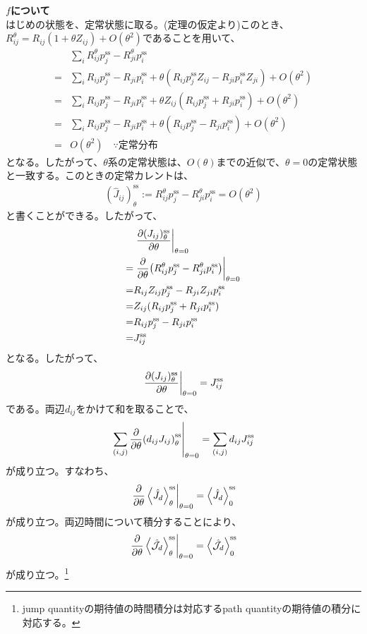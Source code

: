 \documentclass[a4paper,11pt]{jsarticle}
\numberwithin{equation}{section}
\begin{document}
\textbf{$f$について}\\
はじめの状態を、定常状態に取る。(定理の仮定より)このとき、$R_{ij} ^{\theta} = R_{ij}(1+\theta Z_{ij}) + O(\theta^2)$であることを用いて、
\begin{align}
    &\sum_{i}R_{ij}^{\theta} p_j^\text{ss} - R_{ji}^{\theta} p_i^\text{ss} \\
    =& \sum_{i}R_{ij} p_j^\text{ss} - R_{ji} p_i^\text{ss} + \theta (R_{ij} p_j^\text{ss} Z_{ij} - R_{ji} p_i^\text{ss} Z_{ji}) + O(\theta^2)\\
    =& \sum_{i}R_{ij} p_j^\text{ss} - R_{ji} p_i^\text{ss} + \theta Z_{ij}(R_{ij} p_j^\text{ss} + R_{ji} p_i^\text{ss}) + O(\theta^2)\\
    =& \sum_{i}R_{ij} p_j^\text{ss} - R_{ji} p_i^\text{ss} + \theta  (R_{ij} p_j^\text{ss} - R_{ji} p_i^\text{ss}) + O(\theta^2)\\
    =& O(\theta^2) \quad \because \text{定常分布}
\end{align}
となる。したがって、$\theta$系の定常状態は、$O(\theta)$までの近似で、$\theta = 0$の定常状態と一致する。このときの定常カレントは、
\begin{align}
   (\hat{J}_{ij})_\theta^{\text{ss}}:= R_{ij}^\theta p_j^\text{ss} - R_{ji}^\theta p_i^\text{ss} = O(\theta^2)
\end{align}
と書くことができる。したがって、
\begin{align}
    &\eval{\pdv{({{{J}}_{ij}})^{\text{ss}}_\theta}{\theta}}_{\theta = 0} \\
    =& \eval{\pdv{\theta} (R_{ij}^\theta p_j^\text{ss} - R_{ji}^\theta p_i^\text{ss})}_{\theta = 0} \\
    =&  R_{ij} Z_{ij} p_j^\text{ss} - R_{ji} Z_{ji} p_i^\text{ss} \\
    =&  Z_{ij} (R_{ij} p_j^\text{ss} + R_{ji} p_i^\text{ss}) \\
    =&  R_{ij}p_j^\text{ss} - R_{ji}p_i^\text{ss} \\
    =& {J}_{ij}^\text{ss}
\end{align}
となる。したがって、
\begin{align}
    \eval{\pdv{({{J}_{ij}})^{\text{ss}}_\theta}{\theta}}_{\theta = 0} = {J}_{ij}^{\text{ss}}
\end{align}
である。両辺$d_{ij}$をかけて和を取ることで、
\begin{align}
    \left.\sum_{(i,j)} \pdv{\theta} ({d_{ij}{J}_{ij}})^{\text{ss}}_\theta \right|_{\theta = 0} = \sum_{(i,j)} d_{ij} {J}_{ij}^{\text{ss}}
\end{align}
が成り立つ。すなわち、
\begin{align}
    \left.\pdv{\theta} \ev{\hat{{J}}_{d}}^{\text{ss}}_\theta\right|_{\theta = 0} = \ev{\hat{{J}}_{d}}^{\text{ss}}_{0}
\end{align}
が成り立つ。両辺時間について積分することにより、
\begin{align}
    \left.\pdv{\theta} \ev{\hat{{\mathcal{J}}_{d}}}^{\text{ss}}_\theta\right|_{\theta = 0} = \ev{\hat{{\mathcal{J}}_{d}}}^{\text{ss}}_{0}
\end{align}
が成り立つ。\footnote{jump quantityの期待値の時間積分は対応するpath quantityの期待値の積分に対応する。}
\end{document}
